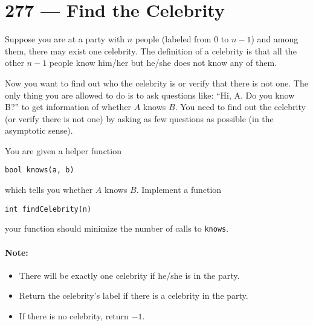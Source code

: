 \section{277 --- Find the Celebrity}
Suppose you are at a party with $n$ people (labeled from 0 to $n-1$) and among them, there may exist one celebrity. The definition of a celebrity is that all the other $n-1$ people know him/her but he/she does not know any of them.
\par
Now you want to find out who the celebrity is or verify that there is not one. The only thing you are allowed to do is to ask questions like: ``Hi, A. Do you know B?'' to get information of whether $A$ knows $B$. You need to find out the celebrity (or verify there is not one) by asking as few questions as possible (in the asymptotic sense).
\par
You are given a helper function 
\setcounter{lstlisting}{0}
\begin{lstlisting}[style=customc]
bool knows(a, b)
\end{lstlisting}
which tells you whether $A$ knows $B$. Implement a function
\setcounter{lstlisting}{0}
\begin{lstlisting}[style=customc]
int findCelebrity(n)
\end{lstlisting}
your function should minimize the number of calls to \texttt{knows}.

\paragraph{Note:} 
\begin{itemize}
\item There will be exactly one celebrity if he/she is in the party. 
\item Return the celebrity's label if there is a celebrity in the party.
\item If there is no celebrity, return $-1$.
\end{itemize}
